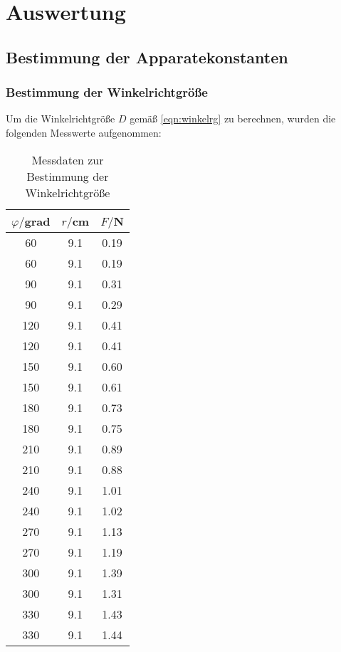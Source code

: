 \section{Auswertung}
\subsection{Bestimmung der Apparatekonstanten}
\subsubsection{Bestimmung der Winkelrichtgröße}
Um die Winkelrichtgröße $D$ gemäß \eqref{eqn:winkelrg} zu berechnen,
wurden die folgenden Messwerte aufgenommen:
\begin{table}
\centering
\caption{Messdaten zur Bestimmung der Winkelrichtgröße}
\label{tab:some_data}
\begin{tabular}{c c c}
\toprule
$\varphi/$grad & $r/$cm & $F/$N \\
\midrule
 60	& 9.1	& 0.19 \\
 60	& 9.1	& 0.19 \\
 90	& 9.1	& 0.31 \\
 90	& 9.1	& 0.29 \\
120 &	9.1 &	0.41 \\
120 &	9.1 &	0.41 \\
150 &	9.1 &	0.60 \\
150 &	9.1 &	0.61 \\
180 &	9.1 &	0.73 \\
180 &	9.1 &	0.75 \\
210 &	9.1 &	0.89 \\
210 &	9.1 &	0.88 \\
240 &	9.1 &	1.01 \\
240 &	9.1 &	1.02 \\
270 &	9.1 &	1.13 \\
270 &	9.1 &	1.19 \\
300 &	9.1 &	1.39 \\
300 &	9.1 &	1.31 \\
330 &	9.1 &	1.43 \\
330 &	9.1 &	1.44 \\
\bottomrule
\end{tabular}
\end{table}

\label{sec:Auswertung}

